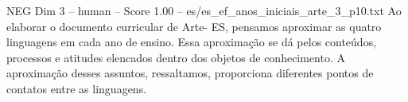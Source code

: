\begin{textsample}{NEG Dim 3 – human – Score 1.00 – es/es\_ef\_anos\_iniciais\_arte\_3\_p10.txt}  \label{ex:f3_neg_002}
Ao elaborar o documento curricular de Arte- ES, pensamos aproximar as quatro linguagens em cada ano de ensino.
Essa aproximação se dá pelos conteúdos, processos e atitudes elencados dentro dos objetos de conhecimento.
A aproximação desses assuntos, ressaltamos, proporciona diferentes pontos de contatos entre as linguagens.

\end{textsample}
